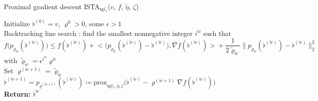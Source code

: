 \documentclass[11pt]{article}
\newcommand{\norm}[1]{\|#1\|}
\begin{document}
\begin{algorithm}[H]
\DontPrintSemicolon
\caption{Proximal gradient descent ISTA$_{\text{sg} l_1}$($v$, $f$, $\tilde \eta$, $\zeta$)}
\label{alg:ISTA}
Initialize $\flat^{(0)}=v$, $\varrho^0 > 0$, some $\epsilon > 1$ \\
{Backtracking line search : find the smallest nonnegative integer $i^{\breve{w}}$ such that
$f\big(p_{\tilde{\varrho}_{\breve{w}}}(\flat^{(\breve{w})})\big) \leq f(\flat^{(\breve{w})}) + \big<\big(p_{\tilde{\varrho}_{\breve{w}}}(\flat^{(\breve{w})}) - \flat^{(\breve{w})}\big), \nabla f(\flat^{(\breve{w})})\big> + \dfrac{1}{2\tilde{\varrho}_{\breve{w}}}\norm{p_{\tilde{\varrho}_{\breve{w}}}(\flat^{(\breve{w})}) - \flat^{(\breve{w})}}_2^2$ 
with $\tilde{\varrho}_{\breve{w}} = \epsilon^{i^{\breve{w}}}\varrho^{\breve{w}}$\\
Set $\varrho^{(\breve{w} + 1)} = \tilde{\varrho}_{\breve{w}}$ \\
$\flat^{(\breve{w}+1)} = p_{\varrho^{(\breve{w} + 1)}}(\flat^{(\breve{w})}) \coloneqq\text{prox}_{\text{sg} l_1, \tilde{\eta}, \zeta} \big(\flat^{(\breve{w})} - \varrho^{(\breve{w} + 1)} \nabla f(\flat^{(\breve{w})}) \big)$ \\
\If{$\dfrac{\norm{\flat^{(\breve{w}+1)} - \flat^{(\breve{w})}}_2}{\varrho^{(\breve{w} + 1)}} < tol$}
  {
    \textbf{Return:} {$\flat^{\breve{w}}$}
  }
}
\end{algorithm}
\end{document}
